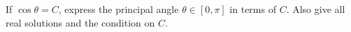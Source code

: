 If $\cos\theta=C$, express the principal angle $\theta\in[0,\pi]$ in terms of $C$. Also give all real solutions and the condition on $C$.
